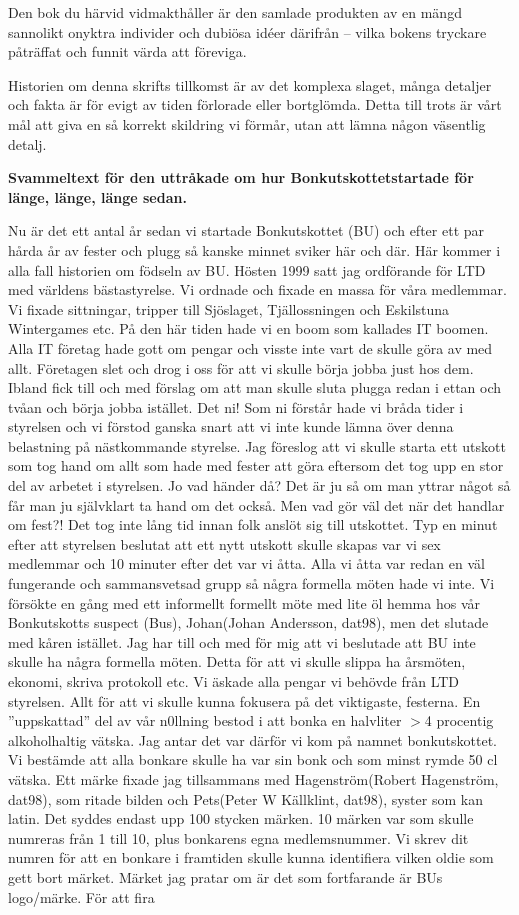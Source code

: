 Den bok du härvid vidmakthåller är den samlade produkten av en mängd sannolikt onyktra individer och dubiösa idéer därifrån -- vilka bokens tryckare påträffat och funnit värda att föreviga.

Historien om denna skrifts tillkomst är av det komplexa slaget, många detaljer och fakta är för evigt av tiden förlorade eller bortglömda. Detta till trots är vårt mål att giva en så korrekt skildring vi förmår, utan att lämna någon väsentlig detalj.

\textbf{Svammeltext för den uttråkade om hur Bonkutskottetstartade för länge, länge, länge sedan.}

Nu är det ett antal år sedan vi startade Bonkutskottet (BU) och efter ett par hårda år av fester och plugg så kanske minnet sviker här och där. Här kommer i alla fall historien om födseln av BU. Hösten 1999 satt jag ordförande för LTD med världens bästastyrelse. Vi ordnade och fixade en massa för våra medlemmar. Vi fixade sittningar, tripper till Sjöslaget, Tjällossningen och Eskilstuna Wintergames etc. På den här tiden hade vi en boom som kallades IT boomen. Alla IT företag hade gott om pengar och visste inte vart de skulle göra av med allt. Företagen slet och drog i oss för att vi skulle börja jobba just hos dem. Ibland fick till och med förslag om att man skulle sluta plugga redan i ettan och tvåan och börja jobba istället. Det ni! Som ni förstår hade vi bråda tider i styrelsen och vi förstod ganska snart att vi inte kunde lämna över denna belastning på nästkommande styrelse. Jag föreslog att vi skulle starta ett utskott som tog hand om allt som hade med fester att göra eftersom det tog upp en stor del av arbetet i styrelsen. Jo vad händer då? Det är ju så om man yttrar något så får man ju självklart ta hand om det också. Men vad gör väl det när det handlar om fest?! Det tog inte lång tid innan folk anslöt sig till utskottet. Typ en minut efter att styrelsen beslutat att ett nytt utskott skulle skapas var vi sex medlemmar och 10 minuter efter det var vi åtta. Alla vi åtta var redan en väl fungerande och sammansvetsad grupp så några formella möten hade vi inte. Vi försökte en gång med ett informellt formellt möte med lite öl hemma hos vår Bonkutskotts suspect (Bus), Johan(Johan Andersson, dat98), men det slutade med kåren istället. Jag har till och med för mig att vi beslutade att BU inte skulle ha några formella möten. Detta för att vi skulle slippa ha årsmöten, ekonomi, skriva protokoll etc. Vi äskade alla pengar vi behövde från LTD styrelsen. Allt för att vi skulle kunna fokusera på det viktigaste, festerna. En ”uppskattad” del av vår n0llning bestod i att bonka en halvliter \(>\)4 procentig alkoholhaltig vätska. Jag antar det var därför vi kom på namnet bonkutskottet. Vi bestämde att alla bonkare skulle ha var sin bonk och som minst rymde 50 cl vätska. Ett märke fixade jag tillsammans med Hagenström(Robert Hagenström, dat98), som ritade bilden och Pets(Peter W Källklint, dat98), syster som kan latin. Det syddes endast upp 100 stycken märken. 10 märken var som skulle numreras från 1 till 10, plus bonkarens egna medlemsnummer. Vi skrev dit numren för att en bonkare i framtiden skulle kunna identifiera vilken oldie som gett bort märket. Märket jag pratar om är det som fortfarande är BUs logo/märke. För att fira 